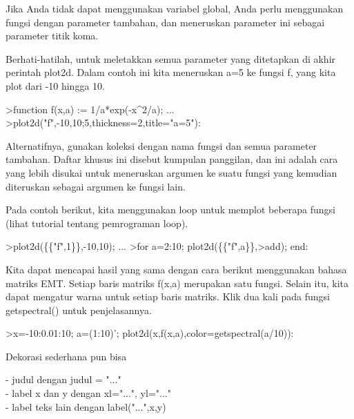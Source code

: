 \documentclass{article}
\begin{document}
\begin{eulernotebook}
\begin{eulercomment}
\begin{eulercomment}
\begin{eulercomment}
\begin{eulercomment}
\begin{eulercomment}
\begin{eulercomment}
\begin{eulercomment}
Jika Anda tidak dapat menggunakan variabel global, Anda perlu
menggunakan fungsi dengan parameter tambahan, dan meneruskan parameter
ini sebagai parameter titik koma.

Berhati-hatilah, untuk meletakkan semua parameter yang ditetapkan di
akhir perintah plot2d. Dalam contoh ini kita meneruskan a=5 ke fungsi
f, yang kita plot dari -10 hingga 10.
\end{eulercomment}
\begin{eulerprompt}
>function f(x,a) := 1/a*exp(-x^2/a); ...
>plot2d("f",-10,10;5,thickness=2,title="a=5"):
\end{eulerprompt}
\begin{eulercomment}
Alternatifnya, gunakan koleksi dengan nama fungsi dan semua parameter
tambahan. Daftar khusus ini disebut kumpulan panggilan, dan ini adalah
cara yang lebih disukai untuk meneruskan argumen ke suatu fungsi yang
kemudian diteruskan sebagai argumen ke fungsi lain.

Pada contoh berikut, kita menggunakan loop untuk memplot beberapa
fungsi (lihat tutorial tentang pemrograman loop).
\end{eulercomment}
\begin{eulerprompt}
>plot2d(\{\{"f",1\}\},-10,10); ...
>for a=2:10; plot2d(\{\{"f",a\}\},>add); end:
\end{eulerprompt}
\begin{eulercomment}
Kita dapat mencapai hasil yang sama dengan cara berikut menggunakan
bahasa matriks EMT. Setiap baris matriks f(x,a) merupakan satu fungsi.
Selain itu, kita dapat mengatur warna untuk setiap baris matriks. Klik
dua kali pada fungsi getspectral() untuk penjelasannya.
\end{eulercomment}
\begin{eulerprompt}
>x=-10:0.01:10; a=(1:10)'; plot2d(x,f(x,a),color=getspectral(a/10)):
\end{eulerprompt}
\begin{eulercomment}
Dekorasi sederhana pun bisa

- judul dengan judul = "..."\\
- label x dan y dengan xl="...", yl="..."\\
- label teks lain dengan label("...",x,y)


\end{eulercomment}
\end{eulercomment}
\end{eulercomment}
\end{eulercomment}
\end{eulercomment}
\end{eulercomment}
\end{eulercomment}
\end{eulernotebook}
\end{document}
